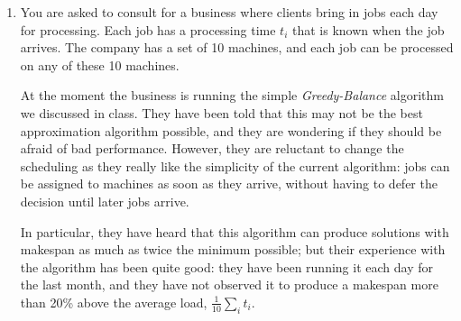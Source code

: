 \documentclass[12pt]{article}
\begin{document}
\begin{enumerate}
{\bf (b)} Show that the number of trucks used by this
algorithm is within a factor of $2$ of the minimum possible number,
for any set of weights and any value of $K$.





\item 

You are asked to consult for a business where clients
bring in jobs each day for processing.
Each job has a processing time $t_i$ that is known when the
job arrives. The company has a set of 10 machines,
and each job can be processed on any of these 10 machines.

At the moment the business is running
the simple {\em Greedy-Balance} algorithm we discussed
in class. They have been told that this may not be the best
approximation algorithm possible, and they are wondering
if they should be afraid of bad performance.
However, they are reluctant to change the scheduling as they
really like the simplicity of the current algorithm:
jobs can be assigned to machines as soon as they arrive,
without having to defer the decision until later jobs arrive.

In particular, they have heard that this algorithm
can produce solutions with makespan as much as twice the minimum
possible; but their experience with the algorithm has been quite good:
they have been running it each day for the last
month, and they have not observed it to produce a
makespan more than 20\% above the average load,
$\frac{1}{10}\sum_i t_i$.


\end{enumerate}
\end{document}
